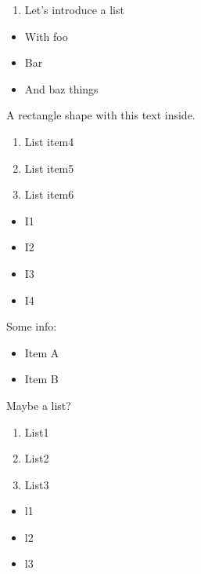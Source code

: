\documentclass[11pt,a4paper]{article}
\begin{document}
\begin{enumerate}
\item Let’s introduce a list
\end{enumerate}

\begin{itemize}
\item With foo
\item Bar
\item And baz things
\end{itemize}

A rectangle shape with this text inside.

\begin{enumerate}
\item List item4
\item List item5
\item List item6
\end{enumerate}

\begin{itemize}
\item I1
\item I2
\item I3
\item I4
\end{itemize}

Some info:

\begin{itemize}
\item Item A
\item Item B
\end{itemize}

Maybe a list?

\begin{enumerate}
\item List1
\item List2
\item List3
\end{enumerate}

\begin{itemize}
\item l1
\item l2
\item l3
\end{itemize}
\end{document}
